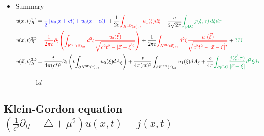 \documentclass[10pt,a4paper]{book}
\theoremstyle{definition}
\begin{document}
\begin{itemize}
\item Summary
\begin{align}
u(x,t)^\text{1D}_R&=
\textcolor{blue}{\frac{1}{2}\left[u_0(x+ct)+u_0(x-ct)\right]}+\frac{1}{2c}
\textcolor{red}{\int_{K^\text{1D}(x)_{ct}}u_1(\xi)d\xi}+\frac{c}{2\sqrt{2\pi}}
\textcolor{Green}{\int_\text{pLC} j(\xi,\tau)\,d\xi d\tau}\\
%
u(\vec{x},t)^\text{2D}_R&=\textcolor{red}{\frac{1}{2\pi c}\partial_t\left(\int_{K^\text{2D}(\vec{x})_{ct}} d^2\xi \frac{u_0(\vec{\xi})}{\sqrt{c^2t^2-|\vec{x}-\vec{\xi}|^2}}\right)}+\frac{1}{2\pi c}\textcolor{red}{\int_{K^\text{2D}(\vec{x})_{ct}} d^2\xi \frac{u_1(\vec{\xi})}{\sqrt{c^2t^2-|\vec{x}-\vec{\xi}|^2}}}+
\textcolor{Green}{???}\\
%
u(\vec{x},t)^\text{3D}_R&=\frac{t}{4\pi(ct)^2}\partial_t\left(t\int_{\partial K^\text{3D}(\vec{x})_{ct}}u_0(\xi)dA_\xi\right)+\frac{t}{4\pi(ct)^2}\int_{\partial K^\text{3D}(\vec{x})_{ct}}u_1(\xi)dA_\xi+\frac{c}{4\pi}
\textcolor{Green}{\int_{\partial\text{pLC}} \frac{j(\vec{\xi},\tau)}{|\vec{r}-\vec{\xi}|}\,d^3\xi d\tau}
\end{align}
\begin{figure}[!h]
$1d$\newline
\begin{center}
\end{center}
\end{figure}

\end{itemize}

\newpage
\subsection{Klein-Gordon equation \texorpdfstring{$\left(\frac{1}{c^2}\partial_{tt}-\triangle+\mu^2\right) u(x,t)= j(x,t)$}{TEXT}}
\end{document}
